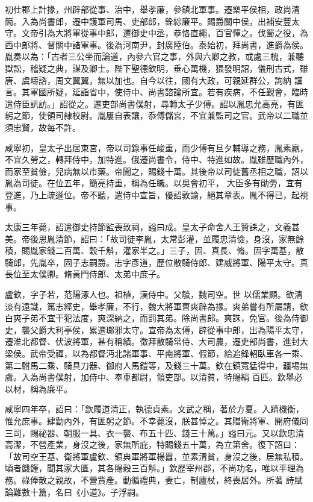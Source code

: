 \begin{pinyinscope}
 初仕郡上計掾，州辟部從事、治中，舉孝廉，參鎮北軍事。遷樂平侯相，政尚清簡。入為尚書郎，遷中護軍司馬、吏部郎，銓綜廉平。賜爵關中侯，出補安豐太守。文帝引為大將軍從事中郎，遷御史中丞，恭恪直繩，百官憚之。伐蜀之役，為西中郎將、督關中諸軍事。後為河南尹，封廣陸伯。泰始初，拜尚書，進爵為侯。胤奏以為：「古者三公坐而論道，內參六官之事，外與六卿之教，或處三槐，兼聽獄訟，稽疑之典，謀及卿士。陛下聖德欽明，垂心萬機，猥發明詔，儀刑古式，雖唐、虞疇諮，周文翼翼，無以加也。自今以往，國有大政，可親延群公，詢納
 讜言。其軍國所疑，延詣省中，使侍中、尚書諮論所宜。若有疾病，不任覲會，臨時遣侍臣訊訪。」詔從之。遷吏部尚書僕射，尋轉太子少傅。詔以胤忠允高亮，有匪躬之節，使領司隸校尉。胤屢自表讓，忝傅儲宮，不宜兼監司之官。武帝以二職並須忠賢，故每不許。



 咸寧初，皇太子出居東宮，帝以司錄事任峻重，而少傅有旦夕輔導之務，胤素羸，不宜久勞之，轉拜侍中，加特進。俄遷尚書令，侍中、特進如故。胤雖歷職內外，而家至貧儉，兒病無以市藥。帝聞之，賜錢十萬。其後帝以司徒舊丞相之職，詔以胤為司徒。在位五年，簡亮持重，稱為任職。以吳會初平，
 大臣多有勛勞，宜有登進，乃上疏遜位。帝不聽，遣侍中宣旨，優詔敦諭，絕其章表。胤不得已，起視事。



 太康三年薨，詔遣御史持節監喪致祠，謚曰成。皇太子命舍人王贊誄之，文義甚美。帝後思胤清節，詔曰：「故司徒李胤，太常彭灌，並履忠清儉，身沒，家無餘積，賜胤家錢二百萬、穀千斛，灌家半之。」三子，固、真長、脩。固字萬基，散騎郎，先胤卒，固子志嗣爵。志字彥道，歷位散騎侍郎、建威將軍、陽平太守。真長位至太僕卿。脩黃門侍郎、太弟中庶子。



 盧欽，字子若，范陽涿人也。祖植，漢侍中。父毓，魏司空。世
 以儒業顯。欽清淡有遠識，篤志經史，舉孝廉，不行，魏大將軍曹爽辟為掾。爽弟嘗有所屬請，欽白爽子弟不宜干犯法度，爽深納之，而罰其弟。除尚書郎。爽誅，免官。後為侍御史，襲父爵大利亭侯，累遷瑯邪太守。宣帝為太傅，辟從事中郎，出為陽平太守，遷淮北都督、伏波將軍，甚有稱績。徵拜散騎常侍、大司農，遷吏部尚書，進封大梁侯。武帝受禪，以為都督沔北諸軍事、平南將軍、假節，給追鋒軺臥車各一乘、第二駙馬二乘、騎具刀器、御府人馬鎧等，及錢三十萬。欽在鎮寬猛得中，疆埸無虞。入為尚書僕射，加侍中、奉車都尉，領吏部。以清貧，特賜絹
 百匹。欽舉必以材，稱為廉平。



 咸寧四年卒，詔曰：「欽履道清正，執德貞素。文武之稱，著於方夏。入躋機衡，惟允庶事。肆勤內外，有匪躬之節。不幸薨沒，朕甚悼之。其贈衛將軍、開府儀同三司，賜祕器、朝服一具、衣一襲、布五十匹、錢三十萬。」謚曰元。又以欽忠清高潔，不營產業，身沒之後，家無所庇，特賜錢五十萬，為立第舍。復下詔曰：「故司空王基、衛將軍盧欽、領典軍將軍楊囂，並素清貧，身沒之後，居無私積。頃者饑饉，聞其家大匱，其各賜穀三百斛。」欽歷宰州郡，不尚功名，唯以平理為務。祿俸散之親故，不營貲產。動循禮典，妻亡，制廬杖，終喪居外。所著
 詩賦論難數十篇，名曰《小道》。子浮嗣。




\end{pinyinscope}

